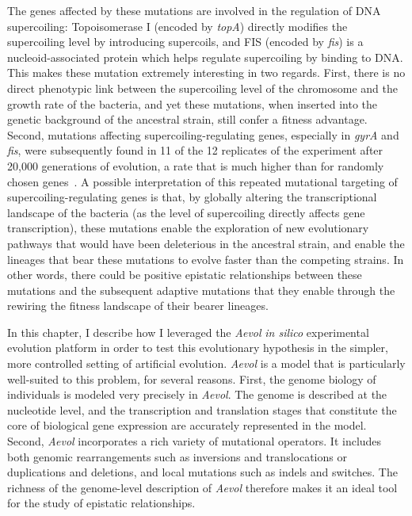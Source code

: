 The genes affected by these mutations are involved in the regulation of DNA supercoiling: Topoisomerase I (encoded by \emph{topA}) directly modifies the supercoiling level by introducing supercoils, and FIS (encoded by \emph{fis}) is a nucleoid-associated protein which helps regulate supercoiling by binding to DNA.
This makes these mutation extremely interesting in two regards.
First, there is no direct phenotypic link between the supercoiling level of the chromosome and the growth rate of the bacteria, and yet these mutations, when inserted into the genetic background of the ancestral strain, still confer a fitness advantage.
Second, mutations affecting supercoiling-regulating genes, especially in \emph{gyrA} and \emph{fis}, were subsequently found in 11 of the 12 replicates of the experiment after 20,000 generations of evolution, a rate that is much higher than for randomly chosen genes~\citep{crozat2010}.
A possible interpretation of this repeated mutational targeting of supercoiling-regulating genes is that, by globally altering the transcriptional landscape of the bacteria (as the level of supercoiling directly affects gene transcription), these mutations enable the exploration of new evolutionary pathways that would have been deleterious in the ancestral strain, and enable the lineages that bear these mutations to evolve faster than the competing strains.
In other words, there could be positive epistatic relationships between these mutations and the subsequent adaptive mutations that they enable through the rewiring the fitness landscape of their bearer lineages.

In this chapter, I describe how I leveraged the \emph{Aevol} \emph{in silico} experimental evolution platform in order to test this evolutionary hypothesis in the simpler, more controlled setting of artificial evolution.
\emph{Aevol} is a model that is particularly well-suited to this problem, for several reasons.
First, the genome biology of individuals is modeled very precisely in \emph{Aevol}.
The genome is described at the nucleotide level, and the transcription and translation stages that constitute the core of biological gene expression are accurately represented in the model.
Second, \emph{Aevol} incorporates a rich variety of mutational operators.
It includes both genomic rearrangements such as inversions and translocations or duplications and deletions, and local mutations such as indels and switches.
The richness of the genome-level description of \emph{Aevol} therefore makes it an ideal tool for the study of epistatic relationships.

